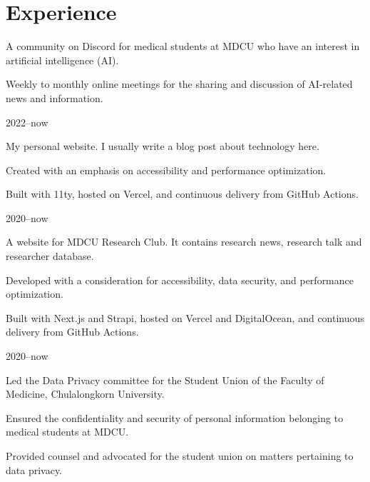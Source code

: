\documentclass{cv}
\begin{document}
\section{Experience}
\begin{cv_table}
  {\begin{cv_itemize}
      \item A community on Discord for medical students at MDCU who have an interest in artificial intelligence (AI).
      \item Weekly to monthly online meetings for the sharing and discussion of AI-related news and information.
    \end{cv_itemize}
  }{}{2022--now}
  {\begin{cv_itemize}
      \item My personal website. I usually write a blog post about technology here.
      \item Created with an emphasis on accessibility and performance optimization.
      \item Built with 11ty, hosted on Vercel, and continuous delivery from GitHub Actions.
    \end{cv_itemize}
  }{}{2020--now}
  {\begin{cv_itemize}
      \item A website for MDCU Research Club. It contains research news, research talk and researcher database.
      \item Developed with a consideration for accessibility, data security, and performance optimization.
      \item Built with Next.js and Strapi, hosted on Vercel and DigitalOcean, and continuous delivery from GitHub Actions.
    \end{cv_itemize}
  }{}{2020--now}
  {\begin{cv_itemize}
      \item Led the Data Privacy committee for the Student Union of the Faculty of Medicine, Chulalongkorn University.
      \item Ensured the confidentiality and security of personal information belonging to medical students at MDCU.
      \item Provided counsel and advocated for the student union on matters pertaining to data privacy.
    \end{cv_itemize}
}
\end{cv_table}
\end{document}
